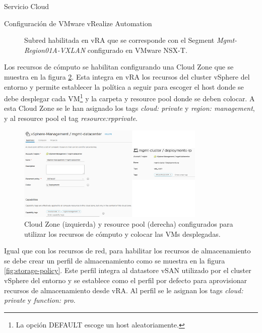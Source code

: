 \begin{subsection}{Servicio Cloud}
\begin{subsubsection}{Configuración de VMware vRealize Automation}
\begin{figure}[h]
            \caption{Subred habilitada en vRA que se corresponde con el Segment \textit{Mgmt-Region01A-VXLAN} configurado en VMware NSX-T.}
            \label{fig:net-profile}
        \end{figure}
        \FloatBarrier
        Los recursos de cómputo se habilitan configurando una Cloud Zone que se muestra en la figura \ref{fig:cloud-zone}. Esta integra en vRA los recursos del cluster vSphere del entorno y permite establecer la política a seguir para escoger el host donde se debe desplegar cada VM\footnote{La opción DEFAULT escoge un host aleatoriamente.} y la carpeta y resource pool donde se deben colocar. A esta Cloud Zone se le han asignado los tags \textit{cloud: private} y \textit{region: management}, y al resource pool el tag \textit{resource:rpprivate}.
       \begin{figure}[h]
            \centering
            \includegraphics[width=0.8\textwidth]{imaxes/pruebaconcepto/vrealize/cloud-zone.png}
            \caption{Cloud Zone (izquierda) y resource pool (derecha) configurados para utilizar los recursos de cómputo y colocar las VMs desplegadas.}
            \label{fig:cloud-zone}
        \end{figure}
        \FloatBarrier
        Igual que con los recursos de red, para habilitar los recursos de almacenamiento se debe crear un perfil de almacenamiento como se muestra en la figura \ref{fig:storage-policy}. Este perfil integra al datastore vSAN utilizado por el cluster vSphere del entorno y se establece como el perfil por defecto para aprovisionar recursos de almacenamiento desde vRA. Al perfil se le asignan los tags \textit{cloud: private} y \textit{function: pro}.

\end{subsubsection}
\end{subsection}
